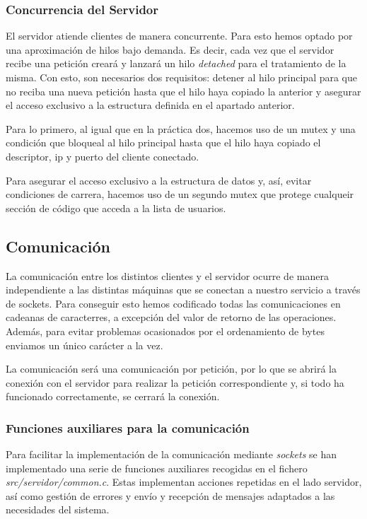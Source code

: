 \documentclass[]{article}
\begin{document}
\subsubsection{Concurrencia del Servidor}
\label{subsec::concurrencia_servidor}
El servidor atiende clientes de manera concurrente. Para esto hemos optado por una aproximación de hilos bajo demanda. Es decir, cada vez que el servidor recibe una petición creará y lanzará un hilo \textit{detached} para el tratamiento de la misma. Con esto, son necesarios dos requisitos: detener al hilo principal para que no reciba una nueva petición hasta que el hilo haya copiado la anterior y asegurar el acceso exclusivo a la estructura definida en el apartado anterior. 

Para lo primero, al igual que en la práctica dos, hacemos uso de un mutex y una condición que bloqueal al hilo principal hasta que el hilo haya copiado el descriptor, ip y puerto del cliente conectado. 

Para asegurar el acceso exclusivo a la estructura de datos y, así, evitar condiciones de carrera, hacemos uso de un segundo mutex que protege cualqueir sección de código que acceda a la lista de usuarios. 

\subsection{Comunicación}
\label{subsec:comunicacion}
La comunicación entre los distintos clientes y el servidor ocurre de manera independiente a las distintas máquinas que se conectan a nuestro servicio a través de sockets. Para conseguir esto hemos codificado todas las comunicaciones en cadeanas de caracterres, a excepción del valor de retorno de las operaciones. Además, para evitar problemas ocasionados por el ordenamiento de bytes enviamos un único carácter a la vez. 

La comunicación será una comunicación por petición, por lo que se abrirá la conexión con el servidor para realizar la petición correspondiente y, si todo ha funcionado correctamente, se cerrará la conexión.

\subsubsection{Funciones auxiliares para la comunicación}
\label{subsec:funciones}
Para facilitar la implementación de la comunicación mediante \textit{sockets} se han implementado una serie de funciones auxiliares recogidas en el fichero \textit{src/servidor/common.c}. Estas implementan acciones repetidas en el lado servidor, así como gestión de errores y envío y recepción de mensajes adaptados a las necesidades del sistema. 
\end{document}

